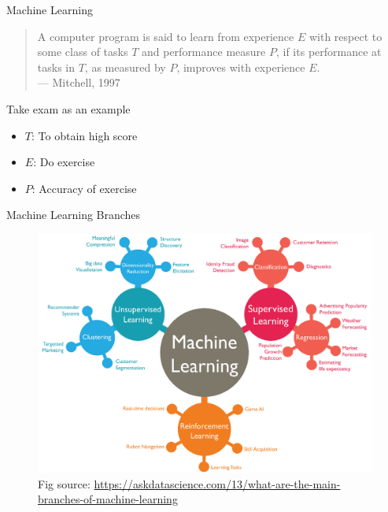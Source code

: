 \documentclass{../TexTemplate/myslide}
\begin{document}
\begin{frame}{Machine Learning}
\begin{quote}
A computer program is said to learn from experience $E$ with respect to some class of tasks $T$ and performance measure $P$,
if its performance at tasks in $T$, as measured by $P$, improves with experience $E$.\\
\hfill--- Mitchell, 1997
\end{quote}
\bigskip
Take exam as an example
\begin{itemize}
	\item $T$: To obtain high score
	\item $E$: Do exercise
	\item $P$: Accuracy of exercise
\end{itemize}
\end{frame}

\begin{frame}{Machine Learning Branches}
\begin{figure}
\centering
\includegraphics[width=0.75\linewidth]{fig/ml_branches.png}
\caption*{\scriptsize Fig source: \url{https://askdatascience.com/13/what-are-the-main-branches-of-machine-learning}}
\end{figure}
\end{frame}
\end{document}
